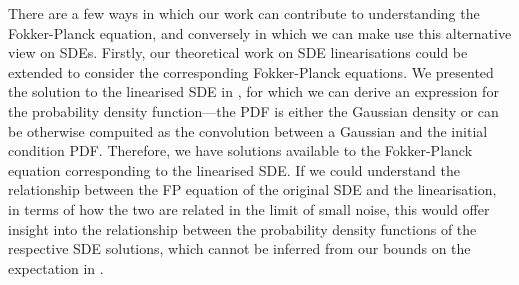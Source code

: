 There are a few ways in which our work can contribute to understanding the Fokker-Planck equation, and conversely in which we can make use this alternative view on SDEs.
Firstly, our theoretical work on SDE linearisations could be extended to consider the corresponding Fokker-Planck equations.
We presented the solution to the linearised SDE in , for which we can derive an expression for the probability density function---the PDF is either the Gaussian density or can be otherwise compuited as the convolution between a Gaussian and the initial condition PDF.
Therefore, we have solutions available to the Fokker-Planck equation corresponding to the linearised SDE.
If we could understand the relationship between the FP equation of the original SDE and the linearisation, in terms of how the two are related in the limit of small noise, this would offer insight into the relationship between the probability density functions of the respective SDE solutions, which cannot be inferred from our bounds on the expectation in .

